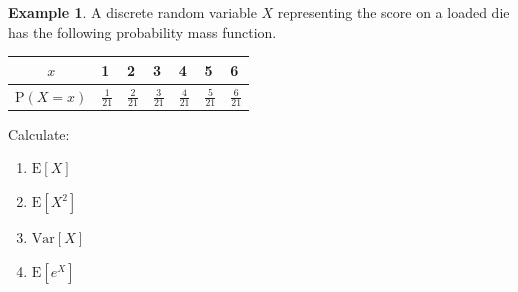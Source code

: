 \documentclass[
]{book}
\theoremstyle{definition}
\theoremstyle{definition}
\newtheorem{example}{Example}[chapter]
\theoremstyle{definition}
\theoremstyle{definition}
\theoremstyle{remark}
\begin{document}
\begin{example}

A discrete random variable \(X\) representing the score on a loaded die has the following probability mass function.

\begin{longtable}[]{@{}cllllll@{}}
\toprule
\begin{minipage}[b]{0.28\columnwidth}\centering
\(x\)\strut
\end{minipage} & \begin{minipage}[b]{0.09\columnwidth}\raggedright
1\strut
\end{minipage} & \begin{minipage}[b]{0.09\columnwidth}\raggedright
2\strut
\end{minipage} & \begin{minipage}[b]{0.09\columnwidth}\raggedright
3\strut
\end{minipage} & \begin{minipage}[b]{0.09\columnwidth}\raggedright
4\strut
\end{minipage} & \begin{minipage}[b]{0.09\columnwidth}\raggedright
5\strut
\end{minipage} & \begin{minipage}[b]{0.09\columnwidth}\raggedright
6\strut
\end{minipage}\tabularnewline
\midrule
\endhead
\begin{minipage}[t]{0.28\columnwidth}\centering
\(\text{P}(X=x)\)\strut
\end{minipage} & \begin{minipage}[t]{0.09\columnwidth}\raggedright
\(\frac{1}{21}\)\strut
\end{minipage} & \begin{minipage}[t]{0.09\columnwidth}\raggedright
\(\frac{2}{21}\)\strut
\end{minipage} & \begin{minipage}[t]{0.09\columnwidth}\raggedright
\(\frac{3}{21}\)\strut
\end{minipage} & \begin{minipage}[t]{0.09\columnwidth}\raggedright
\(\frac{4}{21}\)\strut
\end{minipage} & \begin{minipage}[t]{0.09\columnwidth}\raggedright
\(\frac{5}{21}\)\strut
\end{minipage} & \begin{minipage}[t]{0.09\columnwidth}\raggedright
\(\frac{6}{21}\)\strut
\end{minipage}\tabularnewline
\bottomrule
\end{longtable}

Calculate:

\begin{enumerate}
\def\labelenumi{\alph{enumi})}
\item
  \(\text{E}[X]\)
\item
  \(\text{E}[X^2]\)
\item
  \(\text{Var}[X]\)
\item
  \(\text{E}[e^X]\)
\end{enumerate}

\end{example}
\end{document}
